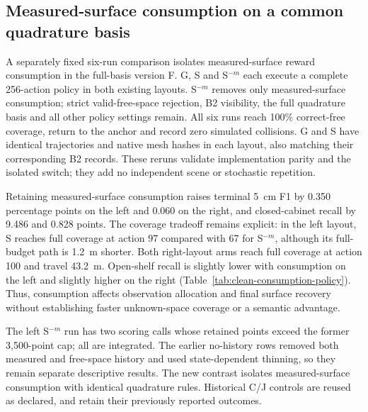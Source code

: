\subsection{Measured-surface consumption on a common quadrature basis}
A separately fixed six-run comparison isolates measured-surface reward consumption in the full-basis version F. G, S and S$^{-m}$ each execute a complete 256-action policy in both existing layouts. S$^{-m}$ removes only measured-surface consumption; strict valid-free-space rejection, B2 visibility, the full quadrature basis and all other policy settings remain. All six runs reach 100\% correct-free coverage, return to the anchor and record zero simulated collisions. G and S have identical trajectories and native mesh hashes in each layout, also matching their corresponding B2 records. These reruns validate implementation parity and the isolated switch; they add no independent scene or stochastic repetition.



Retaining measured-surface consumption raises terminal 5~cm F1 by 0.350 percentage points on the left and 0.060 on the right, and closed-cabinet recall by 9.486 and 0.828 points. The coverage tradeoff remains explicit: in the left layout, S reaches full coverage at action 97 compared with 67 for S$^{-m}$, although its full-budget path is 1.2~m shorter. Both right-layout arms reach full coverage at action 100 and travel 43.2~m. Open-shelf recall is slightly lower with consumption on the left and slightly higher on the right (Table~\ref{tab:clean-consumption-policy}). Thus, consumption affects observation allocation and final surface recovery without establishing faster unknown-space coverage or a semantic advantage.

The left S$^{-m}$ run has two scoring calls whose retained points exceed the former 3,500-point cap; all are integrated. The earlier no-history rows removed both measured and free-space history and used state-dependent thinning, so they remain separate descriptive results. The new contrast isolates measured-surface consumption with identical quadrature rules. Historical C/J controls are reused as declared, and retain their previously reported outcomes.
